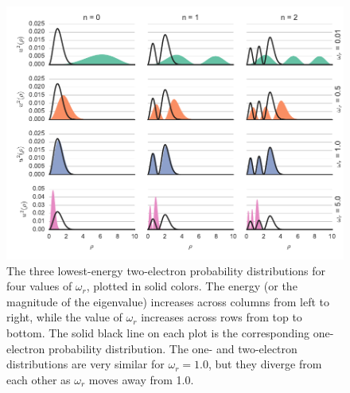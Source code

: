 \documentclass[aps,prc,reprint,nobalancelastpage]{revtex4-1}
\begin{document}
\begin{figure}[p]
    \includegraphics{wavefunctions.pdf}
    \caption{The three lowest-energy two-electron probability distributions for four values of $\omega_r$, plotted in solid colors. The energy (or the magnitude of the eigenvalue) increases across columns from left to right, while the value of $\omega_r$ increases across rows from top to bottom. The solid black line on each plot is the corresponding one-electron probability distribution. The one- and two-electron distributions are very similar for $\omega_r = 1.0$, but they diverge from each other as $\omega_r$ moves away from 1.0.}
    \label{fig:wavefunctions}
\end{figure}


\end{document}
